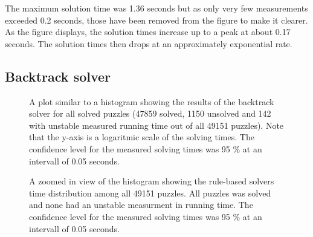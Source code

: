 \documentclass[a4paper,11pt]{kth-mag}
\begin{document}
The maximum solution time was 1.36 seconds but as only very few measurements exceeded 0.2 seconds, those have been removed from the figure to make it clearer.
As the figure displays, the solution times increase up to a peak at about 0.17 seconds.
The solution times then drops at an approximately exponential rate.

\FloatBarrier
\subsection{Backtrack solver}

\begin{figure}[here] 
\noindent{}
\caption{A plot similar to a histogram showing the results of the backtrack solver for all solved puzzles (47859 solved, 1150 unsolved and 142 with unstable measured running time out of all 49151 puzzles). Note that the y-axis is a logaritmic scale of the solving times. The confidence level for the measured solving times was 95 \% at an intervall of 0.05 seconds.}
\label{fig:backtrackDistribution}
\end{figure}

\begin{figure}[here] 
\noindent{}
\caption{A zoomed in view of the histogram showing the rule-based solvers time distribution among all 49151 puzzles. All puzzles was solved and none had an unstable measurment in running time. The confidence level for the measured solving times was 95 \% at an intervall of 0.05 seconds.}
\label{fig:rule-basedDistribution}
\end{figure}
\end{document}
